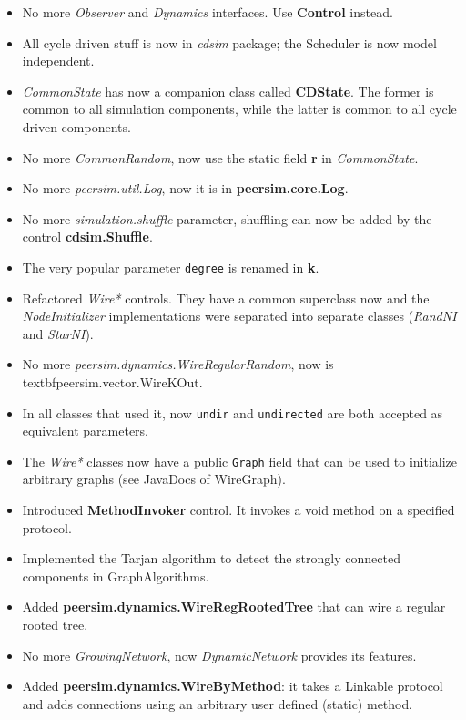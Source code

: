 \documentclass[a4paper,11pt]{article}
\begin{document}
\begin{itemize}

\item No more \emph{Observer} and \emph{Dynamics} interfaces. Use
  \textbf{Control} instead.

\item All cycle driven stuff is now in \emph{cdsim} package; the Scheduler is
    now model independent.

\item \emph{CommonState} has now a companion class called
  \textbf{CDState}. The former is common to all simulation components,
  while the latter is common to all cycle driven components.

\item No more \emph{CommonRandom}, now use the static field \textbf{r}
  in \emph{CommonState}.

\item No more \emph{peersim.util.Log}, now it is in \textbf{peersim.core.Log}.

\item No more \emph{simulation.shuffle} parameter, shuffling can now be
  added by the control \textbf{cdsim.Shuffle}.

\item The very popular parameter \texttt{degree} is renamed in
  \textbf{k}.

\item Refactored \emph{Wire*} controls. They have a common superclass now and
  the \emph{NodeInitializer} implementations were separated into separate classes
  (\emph{RandNI} and \emph{StarNI}).

\item No more \emph{peersim.dynamics.WireRegularRandom}, now is
  textbf{peersim.vector.WireKOut}. 

\item In all classes that used it, now \texttt{undir} and \texttt{undirected} are both
  accepted as equivalent parameters.

\item The \emph{Wire*} classes now have a public \texttt{Graph} field that can be used to
  initialize arbitrary graphs (see JavaDocs of WireGraph).

\item Introduced \textbf{MethodInvoker} control. It invokes a void
  method on a specified protocol.

\item Implemented the Tarjan algorithm to detect the strongly connected components
  in GraphAlgorithms.

\item Added \textbf{peersim.dynamics.WireRegRootedTree} that can wire
  a regular rooted tree.

\item No more \emph{GrowingNetwork}, now \emph{DynamicNetwork}
  provides its features. 

\item Added \textbf{peersim.dynamics.WireByMethod}: it takes a
  Linkable protocol and adds connections using an arbitrary
  user defined (static) method. 

\end{itemize} 
\end{document}
